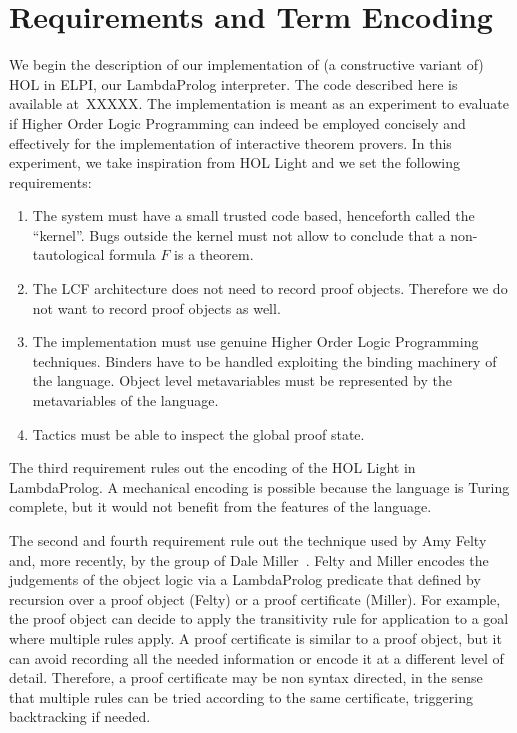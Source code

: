 \documentclass[preprint]{sigplanconf}
\begin{document}
\section{Requirements and Term Encoding}
We begin the description of our implementation of (a constructive variant of)
HOL in ELPI, our LambdaProlog interpreter. The code described here is available at~XXXXX. The implementation is meant as an experiment to evaluate if Higher Order Logic Programming can indeed be employed concisely and effectively for the implementation of interactive theorem provers. In this experiment, we take inspiration from HOL Light and we set the following requirements:
\begin{enumerate}
\item The system must have a small trusted code based, henceforth called the ``kernel''. Bugs outside the kernel must not allow to conclude that a non-tautological formula $F$ is a theorem.
\item The LCF architecture does not need to record proof objects. Therefore we do not want to record proof objects as well.
\item The implementation must use genuine Higher Order Logic Programming techniques. Binders have to be handled exploiting the binding machinery of the language. Object level metavariables must be represented by the metavariables of the language.
\item Tactics must be able to inspect the global proof state.
\end{enumerate}

The third requirement rules out the encoding of the HOL Light in LambdaProlog. A mechanical encoding is possible because the language is Turing complete, but it would not benefit from the features of the language.

The second and fourth requirement rule out the technique used by Amy Felty and, more recently, by the group of Dale Miller~\cite{???}. Felty and Miller encodes the judgements of the object logic via a LambdaProlog predicate that defined by recursion over a proof object (Felty) or a proof certificate (Miller).
For example, the proof object can decide to apply the transitivity rule for application to a goal where multiple rules apply. A proof certificate is similar to a proof object, but it can avoid recording all the needed information or encode it at a different level of detail. Therefore, a proof certificate may be non syntax directed, in the sense that multiple rules can be tried according to the same certificate, triggering backtracking if needed.
\end{document}
